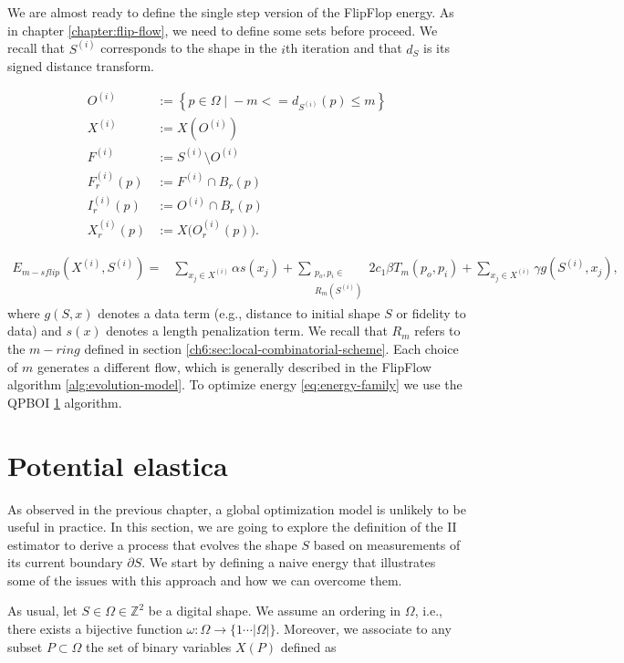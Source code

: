 We are almost ready to define the single step version of the FlipFlop energy. As in chapter \ref{chapter:flip-flow}, we need to define some sets before proceed. We recall that $S^{(i)}$ corresponds to the shape in the $i$th iteration and that $d_S$ is its signed distance transform.

\begin{align*}
	O^{(i)} &:=\left\{ p \in \Omega \; | \; -m <= d_{S^{(i)}}(p) \leq m \right\}\\
	X^{(i)} &:= X(O^{(i)})  \\
	F^{(i)} &:= S^{(i)} \setminus O^{(i)} \\
	F_r^{(i)}(p) &:= F^{(i)} \cap B_r(p)\\
	I_r^{(i)}(p) &:= O^{(i)} \cap B_r(p) \\
	X_r^{(i)}(p) &:= X\big( O_r^{(i)}(p) \big).
\end{align*}


\begin{align}
  E_{m-sflip}(X^{(i)},S^{(i)}) =& \sum_{x_j \in X^{(i)}}{\alpha s(x_j)} + \sum_{ \substack{p_o,p_i \in \\ R_m(S^{(i)})}}{ 2c_1 \beta  T_m(p_o,p_i) }+ \sum_{x_j \in X^{(i)}}{\gamma g(S^{(i)},x_j)},
  \label{eq:single-step-energy-family}
\end{align}
where $g(S,x)$ denotes a data term (e.g., distance to initial shape $S$ or fidelity to data) and $s(x)$ denotes a length penalization term. We recall that $R_m$ refers to the $m-ring$ defined in section \ref{ch6:sec:local-combinatorial-scheme}. Each choice of $m$ generates a different flow, which is generally described in the FlipFlow algorithm \ref{alg:evolution-model}. To optimize energy \eqref{eq:energy-family} we use the QPBOI \ref{} algorithm.

\section{Potential elastica}

As observed in the previous chapter, a global optimization model is unlikely to be useful in practice. In this section, we are going to explore the definition of the II estimator to derive a process that evolves the shape $S$ based on measurements of its current boundary $\partial S$. We start by defining a naive energy that illustrates some of the issues with this approach and how we can overcome them.

As usual, let $S \in \Omega \in \mathbb{Z}^2$ be a digital shape. We assume an ordering in $\Omega$, i.e., there exists a bijective function $\omega : \Omega \rightarrow \{1 \cdots |\Omega| \}$. Moreover, we associate to any subset $P \subset \Omega$ the set of binary variables $X(P)$ defined as

